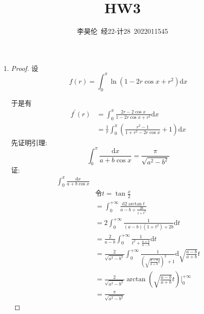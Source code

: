 \documentclass{article}
\title{HW3}
\author{李昊伦\ 经22-计28\ 2022011545}
\begin{document}
\maketitle
\begin{enumerate}
    \item \begin{proof}
        设 \begin{equation}
            f(r)=\int_{0}^{\pi}\ln(1-2r\cos x+r^2)\mathrm{d}x
            \nonumber
        \end{equation} \par
        于是有 \begin{equation}
            \begin{aligned}
                f^{'}(r)
                &=\int_{0}^{\pi}\frac{2r-2\cos x}{1-2r\cos x+r^2}\mathrm{d}x \\
                &=\frac{1}{r}\int_{0}^{\pi}\left(\frac{r^2-1}{1+r^2-2r\cos x}+1\right)\mathrm{d}x
            \end{aligned}
            \nonumber
        \end{equation}
        先证明引理: \begin{equation}
            \int_{0}^{\pi}\frac{\mathrm{d}x}{a+b\cos x}=\frac{\pi}{\sqrt{a^2-b^2}}
            \nonumber
        \end{equation}
        证: \begin{equation}
            \begin{aligned}
                \int_{0}^{\pi}\frac{\mathrm{d}x}{a+b\cos x} \\
                &\text{令} t=\tan\frac{x}{2} \\
                &=\int_{0}^{+\infty}\frac{\mathrm{d}2\arctan t}{a-b+\frac{2b}{1+t^2}} \\
                &=2\int_{0}^{+\infty}\frac{1}{(a-b)(1+t^2)+2b}\mathrm{d}t \\
                &=\frac{2}{a-b}\int_{0}^{+\infty}\frac{1}{t^2+\frac{a+b}{a-b}}\mathrm{d}t \\
                &=\frac{2}{\sqrt{a^2-b^2}}\int_{0}^{+\infty}\frac{1}{\left(\sqrt{\frac{a-b}{a+b}t}\right)^2+1}\mathrm{d}\sqrt{\frac{a-b}{a+b}}t \\
                &=\frac{2}{\sqrt{a^2-b^2}}\arctan\left(\sqrt{\frac{a-b}{a+b}}t\right)\bigg|_{0}^{+\infty} \\
                &=\frac{\pi}{\sqrt{a^2-b^2}}
            \end{aligned}
            \nonumber
        \end{equation}

\end{proof}
\end{enumerate}
\end{document}
